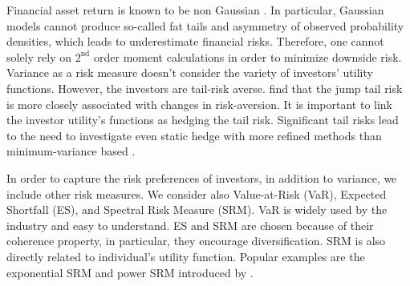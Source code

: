 \documentclass[11pt,a4paper,english]{article}
\providecommand{\natp}[1]{\textcolor{darkorange}{#1}}
\begin{document}
Financial asset return is known to be non Gaussian \citep{fama1963mandelbrot}.
In particular, Gaussian models cannot produce so-called fat tails and asymmetry of observed probability densities,
which leads to underestimate financial risks.
Therefore, one cannot solely rely on $2^\text{nd}$ order moment calculations in order to
minimize downside risk. Variance as a risk measure doesn't consider the variety of investors' utility functions. However, the investors are tail-risk averse.
\citet{bollerslev2015tail} find that the jump tail risk is more closely associated with changes in risk-aversion.
It is important to link the investor utility's functions as hedging the tail risk.
Significant tail risks lead to the need to investigate even static hedge with more refined methods than minimum-variance based \citep{ederington2008minimum}. \medskip

In order to capture the risk preferences of investors, in addition to variance, we include other risk measures.
We consider also Value-at-Risk (VaR), Expected Shortfall (ES), and Spectral Risk Measure (SRM).
VaR is widely used by the industry and easy to understand.
ES and SRM are chosen because of their coherence property, in particular, they encourage diversification.
SRM is also directly related to individual's utility function.
Popular examples are the exponential SRM and power SRM introduced by
\citet{dowd2008spectral}.\medskip
\end{document}
